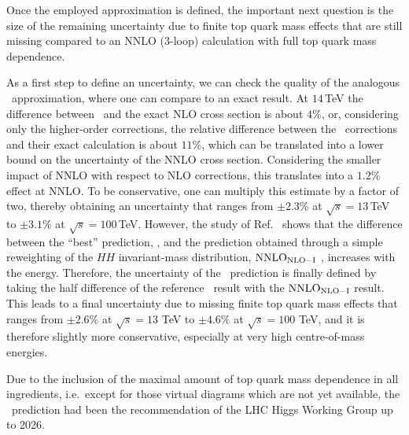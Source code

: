 Once the employed approximation is defined, the important next question is the size of the remaining uncertainty due to finite top quark mass effects that are still missing compared to an NNLO (3-loop) calculation with full top quark mass dependence.

As a first step to define an uncertainty, we can check the quality of the analogous \nloFT\ approximation, where one can compare to an exact result. At $14$\,TeV the difference between \nloFT\ and the exact NLO cross section is about $4\%$, or, considering only the higher-order corrections, the relative difference between the \nloFT\ corrections and their exact calculation is about $11\%$, which can be translated into a lower bound on the uncertainty of the NNLO cross section. Considering the smaller impact of NNLO with respect to NLO corrections, this translates into a $1.2\%$ effect at NNLO. To be conservative, one can multiply this estimate by a factor of two, thereby obtaining an uncertainty that ranges from $\pm 2.3\%$ at $\sqrt{s}=13$\,TeV to $\pm 3.1\%$ at $\sqrt{s}=100$\,TeV.
However, the study of Ref.~\cite{Grazzini:2018bsd} shows that the difference between the ``best'' prediction, \nnloFT, and the prediction obtained through a simple reweighting of the $HH$ invariant-mass distribution, ${\rm NNLO}_{\rm NLO-I}$ \cite{Borowka:2016ypz}, increases with the energy. Therefore, the uncertainty of the \nnloFT\ prediction is finally defined by taking the half difference of the reference \nnloFT\ result with the ${\rm NNLO}_{\rm NLO-I}$ result. This leads to a final uncertainty due to missing finite top quark mass effects that ranges from $\pm 2.6\%$ at $\sqrt{s}=13$ TeV to $\pm 4.6\%$ at $\sqrt{s}=100$ TeV, and it is therefore slightly more conservative, especially at very high centre-of-mass energies.

Due to the inclusion of the maximal amount of top quark mass dependence in all ingredients, i.e.\ except for those virtual diagrams which are not yet available, the \nnloFT\ prediction had been the recommendation of the LHC Higgs Working Group up to 2026.
